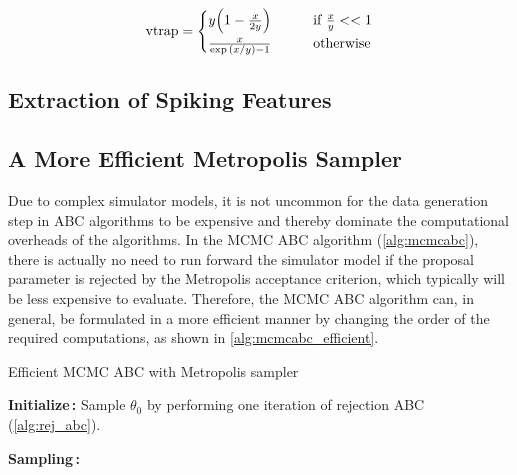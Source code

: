 \begin{equation}\label{eq:vtrap}
    \mathrm{vtrap} = \begin{cases}
    y \qty(1 - \frac{x}{2y}) \qquad &\text{if } \frac{x}{y} << 1
    \\
    \frac{x}{\exp \qty(x/y) - 1} \qquad &\text{otherwise}
    \end{cases}
\end{equation}

\subsection{Extraction of Spiking Features} 



\subsection{A More Efficient Metropolis Sampler}

Due to complex simulator models, it is not uncommon for the data generation step in ABC algorithms to be expensive and thereby dominate the computational overheads of the algorithms. In the MCMC ABC algorithm (\cref{alg:mcmcabc}), there is actually no need to run forward the simulator model if the proposal parameter is rejected by the Metropolis acceptance criterion, which typically will be less expensive to evaluate. Therefore, the MCMC ABC algorithm can, in general, be formulated in a more efficient manner by changing the order of the required computations, as shown in \cref{alg:mcmcabc_efficient}. 

\begin{algorithm}[!htb]
\caption{Efficient MCMC ABC with Metropolis sampler}
\label{alg:mcmcabc_efficient}
\SetAlgoLined
\DontPrintSemicolon
 \textbf{Initialize\,:}\;
 \nl Sample $\theta_0$ by performing one iteration of rejection ABC (\cref{alg:rej_abc}).\;

 \vspace{5mm}
 \textbf{Sampling\,:}\;
\end{algorithm}


